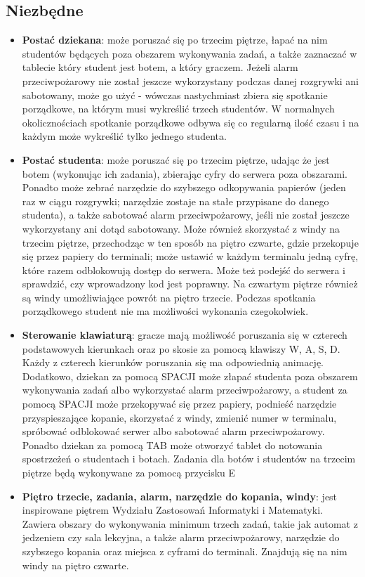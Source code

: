 \documentclass[]{report}
\begin{document}
\subsection{Niezbędne}
\begin{itemize}
	\item \textbf{Postać dziekana}: może poruszać się po trzecim piętrze, łapać na nim studentów będących poza obszarem wykonywania zadań, a także zaznaczać w tablecie który student jest botem, a który graczem. Jeżeli alarm przeciwpożarowy nie został jeszcze wykorzystany podczas danej rozgrywki ani sabotowany, może go użyć - wówczas nastychmiast zbiera się spotkanie porządkowe, na którym musi wykreślić trzech studentów. W normalnych okolicznościach spotkanie porządkowe odbywa się co regularną ilość czasu i na każdym może wykreślić tylko jednego studenta.
	\item \textbf{Postać studenta}: może poruszać się po trzecim piętrze, udając że jest botem (wykonując ich zadania), zbierając cyfry do serwera poza obszarami. Ponadto może zebrać narzędzie do szybszego odkopywania papierów (jeden raz w ciągu rozgrywki; narzędzie zostaje na stałe przypisane do danego studenta), a także sabotować alarm przeciwpożarowy, jeśli nie został jeszcze wykorzystany ani dotąd sabotowany. Może również skorzystać z windy na trzecim piętrze, przechodząc w ten sposób na piętro czwarte, gdzie przekopuje się przez papiery do terminali; może ustawić w każdym terminalu jedną cyfrę, które razem odblokowują dostęp do serwera. Może też podejść do serwera i sprawdzić, czy wprowadzony kod jest poprawny. Na czwartym piętrze również są windy umożliwiające powrót na piętro trzecie. Podczas spotkania porządkowego student nie ma możliwości wykonania czegokolwiek.
	\item \textbf{Sterowanie klawiaturą}: gracze mają możliwość poruszania się w czterech podstawowych kierunkach oraz po skosie za pomocą klawiszy W, A, S, D. Każdy z czterech kierunków poruszania się ma odpowiednią animację. Dodatkowo, dziekan za pomocą SPACJI może złapać studenta poza obszarem wykonywania zadań albo wykorzystać alarm przeciwpożarowy, a student za pomocą SPACJI może przekopywać się przez papiery, podnieść narzędzie przyspieszające kopanie, skorzystać z windy, zmienić numer w terminalu, spróbować odblokować serwer albo sabotować alarm przeciwpożarowy. Ponadto dziekan za pomocą TAB może otworzyć tablet do notowania spostrzeżeń o studentach i botach. Zadania dla botów i studentów na trzecim piętrze będą wykonywane za pomocą przycisku E
	\item \textbf{Piętro trzecie, zadania, alarm, narzędzie do kopania, windy}: jest inspirowane piętrem Wydziału Zastosowań Informatyki i Matematyki. Zawiera obszary do wykonywania minimum trzech zadań, takie jak automat z jedzeniem czy sala lekcyjna, a także alarm przeciwpożarowy, narzędzie do szybszego kopania oraz miejsca z cyframi do terminali. Znajdują się na nim windy na piętro czwarte.

\end{itemize}
\end{document}
